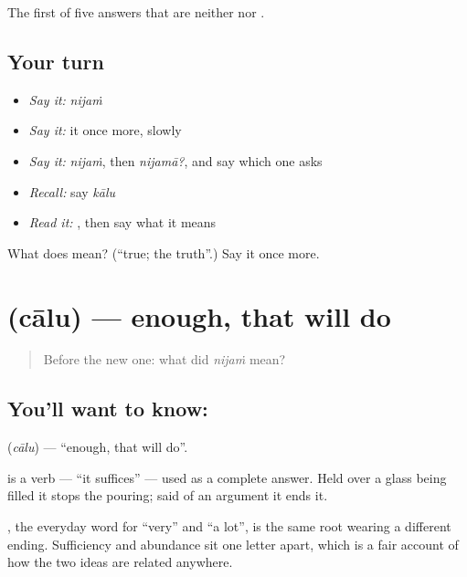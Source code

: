 \begin{grammarlens}[title={What you've built}]
The first of five answers that are neither  nor .
\end{grammarlens}

\subsection*{Your turn}
\begin{itemize}
\raggedright
  \item \emph{Say it:} \emph{nijaṁ}
  \item \emph{Say it:} it once more, slowly
  \item \emph{Say it:} \emph{nijaṁ}, then \emph{nijamā?}, and say which one asks
  \item \emph{Recall:} say \emph{kālu}
  \item \emph{Read it:} \textbf{}, then say what it means
\end{itemize}

\begin{tcolorbox}[breakable,colback=teal!4,colframe=teal!35!black,title={Before you move on}]
What does  mean? (\textquotedblleft{}true; the truth\textquotedblright{}.) Say it once more.
\end{tcolorbox}
\section[\texorpdfstring{\te{చాలు} (cālu)}{చాలు (cālu)}]{ (cālu) — enough, that will do}

\label{lesson:TE-C49-enough}



\begin{quote}
Before the new one: what did \emph{nijaṁ} mean?
\end{quote}

\subsection*{You'll want to know: }
\textbf{} (\emph{cālu}) — \textquotedblleft{}enough, that will do\textquotedblright{}.

 is a verb — \textquotedblleft{}it suffices\textquotedblright{} — used as a complete answer. Held over a glass being filled it stops the pouring; said of an argument it ends it.

, the everyday word for \textquotedblleft{}very\textquotedblright{} and \textquotedblleft{}a lot\textquotedblright{}, is the same root wearing a different ending. Sufficiency and abundance sit one letter apart, which is a fair account of how the two ideas are related anywhere.

